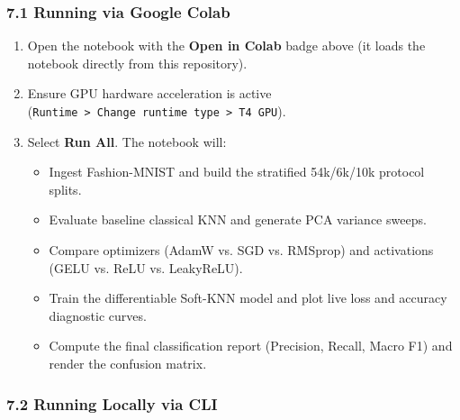 \subsubsection{7.1 Running via Google
Colab}\label{71-running-via-google-colab}

\href{https://colab.research.google.com/github/workforakng/fashion-mnist-knn-optimization/blob/main/fashion_knn_colab.ipynb}{}

\begin{enumerate}
\def\labelenumi{\arabic{enumi}.}
\tightlist
\item
  Open the notebook with the \textbf{Open in Colab} badge above (it
  loads the notebook directly from this repository).
\item
  Ensure GPU hardware acceleration is active
  (\texttt{Runtime\ \textgreater{}\ Change\ runtime\ type\ \textgreater{}\ T4\ GPU}).
\item
  Select \textbf{Run All}. The notebook will:

  \begin{itemize}
  \tightlist
  \item
    Ingest Fashion-MNIST and build the stratified 54k/6k/10k protocol
    splits.
  \item
    Evaluate baseline classical KNN and generate PCA variance sweeps.
  \item
    Compare optimizers (AdamW vs. SGD vs. RMSprop) and activations (GELU
    vs. ReLU vs. LeakyReLU).
  \item
    Train the differentiable Soft-KNN model and plot live loss and
    accuracy diagnostic curves.
  \item
    Compute the final classification report (Precision, Recall, Macro
    F1) and render the confusion matrix.
  \end{itemize}
\end{enumerate}

\subsubsection{7.2 Running Locally via
CLI}\label{72-running-locally-via-cli}

\begin{Shaded}
\begin{Highlighting}[]
 


\end{Highlighting}
\end{Shaded}

